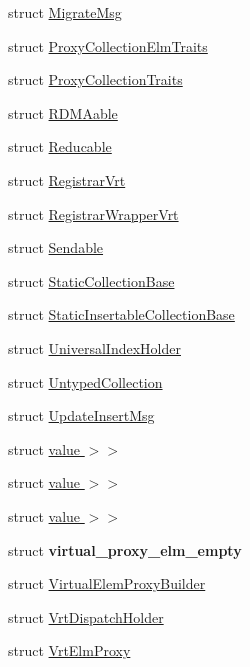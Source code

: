 \begin{DoxyCompactItemize}
struct \hyperlink{structvt_1_1vrt_1_1collection_1_1_migrate_msg}{Migrate\+Msg}
\item 
struct \hyperlink{structvt_1_1vrt_1_1collection_1_1_proxy_collection_elm_traits}{Proxy\+Collection\+Elm\+Traits}
\item 
struct \hyperlink{structvt_1_1vrt_1_1collection_1_1_proxy_collection_traits}{Proxy\+Collection\+Traits}
\item 
struct \hyperlink{structvt_1_1vrt_1_1collection_1_1_r_d_m_aable}{R\+D\+M\+Aable}
\item 
struct \hyperlink{structvt_1_1vrt_1_1collection_1_1_reducable}{Reducable}
\item 
struct \hyperlink{structvt_1_1vrt_1_1collection_1_1_registrar_vrt}{Registrar\+Vrt}
\item 
struct \hyperlink{structvt_1_1vrt_1_1collection_1_1_registrar_wrapper_vrt}{Registrar\+Wrapper\+Vrt}
\item 
struct \hyperlink{structvt_1_1vrt_1_1collection_1_1_sendable}{Sendable}
\item 
struct \hyperlink{structvt_1_1vrt_1_1collection_1_1_static_collection_base}{Static\+Collection\+Base}
\item 
struct \hyperlink{structvt_1_1vrt_1_1collection_1_1_static_insertable_collection_base}{Static\+Insertable\+Collection\+Base}
\item 
struct \hyperlink{structvt_1_1vrt_1_1collection_1_1_universal_index_holder}{Universal\+Index\+Holder}
\item 
struct \hyperlink{structvt_1_1vrt_1_1collection_1_1_untyped_collection}{Untyped\+Collection}
\item 
struct \hyperlink{structvt_1_1vrt_1_1collection_1_1_update_insert_msg}{Update\+Insert\+Msg}
\item 
struct \hyperlink{structvt_1_1vrt_1_1collection_1_1_default_map_3_01_collection_t_00_01typename_01std_1_1enable__i0c13cd14d7af17b34311bb8ce93d9804}{value $>$$>$}
\item 
struct \hyperlink{structvt_1_1vrt_1_1collection_1_1_default_map_3_01_collection_t_00_01typename_01std_1_1enable__id31d055881d6867942086ee5834ad7b4}{value $>$$>$}
\item 
struct \hyperlink{structvt_1_1vrt_1_1collection_1_1_default_map_3_01_collection_t_00_01typename_01std_1_1enable__ib7e55b659c64f165e6a671fb7294e371}{value $>$$>$}
\item 
struct {\bfseries virtual\+\_\+proxy\+\_\+elm\+\_\+empty}
\item 
struct \hyperlink{structvt_1_1vrt_1_1collection_1_1_virtual_elem_proxy_builder}{Virtual\+Elem\+Proxy\+Builder}
\item 
struct \hyperlink{structvt_1_1vrt_1_1collection_1_1_vrt_dispatch_holder}{Vrt\+Dispatch\+Holder}
\item 
struct \hyperlink{structvt_1_1vrt_1_1collection_1_1_vrt_elm_proxy}{Vrt\+Elm\+Proxy}
\end{DoxyCompactItemize}
